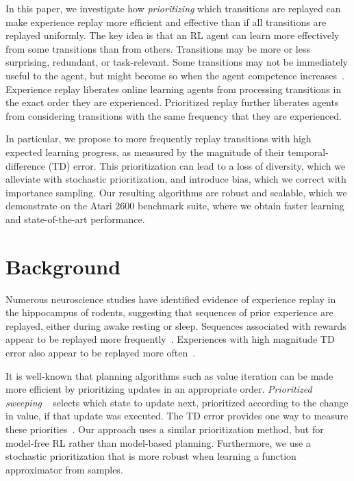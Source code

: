 \documentclass[a4paper]{article}
\begin{document}
In this paper, we investigate how \emph{prioritizing} which transitions are replayed 
can make experience replay more efficient and effective than if all transitions are replayed uniformly.
The key idea is that an RL agent can learn more effectively from some transitions than from others.
Transitions may be more or less surprising, redundant, or task-relevant. 
Some transitions may not be immediately useful to the agent, but might become so when the agent competence increases~\citep{curiosity}.
Experience replay liberates online learning agents from processing transitions 
in the exact order they are experienced. 
Prioritized replay further liberates agents from considering transitions with the same frequency that they are experienced.

In particular, we propose to more frequently replay transitions with high expected learning progress, 
as measured by the magnitude of their temporal-difference (TD) error. 
This prioritization can lead to a loss of diversity, which we alleviate with stochastic prioritization,
and introduce bias, which we correct with importance sampling.
Our resulting algorithms are robust and scalable, which we demonstrate
on the Atari 2600 benchmark suite, where we obtain faster learning and state-of-the-art performance.

\section{Background}

Numerous neuroscience studies have identified evidence of experience replay in the hippocampus of rodents, suggesting that sequences of prior experience are replayed, either during awake resting or sleep. Sequences associated with rewards appear to be replayed more frequently~\citep{dharsh1,dharsh2,dharsh3}. Experiences with high magnitude TD error also appear to be replayed more often~\citep{dharsh4,dharsh5}. 

It is well-known that planning algorithms such as value iteration can be made more efficient by prioritizing updates in an appropriate order. \emph{Prioritized sweeping} ~\citep{prioritized-sweeping,gen-sweeping} selects which state to update next, prioritized according to the change in value, if that update was executed. The TD error provides one way to measure these priorities~\citep{harm}. Our approach uses a similar prioritization method, but for model-free RL rather than model-based planning. Furthermore, we use a stochastic prioritization that is more robust when learning a function approximator from samples.
\end{document}
